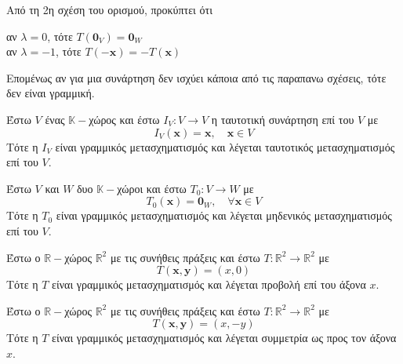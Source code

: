 \begin{rem}
    Από τη 2η σχέση του ορισμού, προκύπτει ότι
      \begin{center}
        αν $ \lambda = 0 $, τότε $ T(\mathbf{0}_{V}) = \mathbf{0}_{W} $ \\
        αν $ \lambda = -1 $, τότε $T(- \mathbf{x}) = - T(\mathbf{x}) $
      \end{center}
      Επομένως αν για μια συνάρτηση δεν ισχύει κάποια από τις παραπανω σχέσεις, τότε 
      δεν είναι γραμμική.
\end{rem}


\begin{example}[Ταυτοτικός]
  Έστω $V$ ένας $ \mathbb{K} - $χώρος και έστω $ I_{V} \colon V \to V $ η ταυτοτική 
  συνάρτηση επί του $V$ με 
  \[
    I_{V}(\mathbf{x}) = \mathbf{x}, \quad \mathbf{x} \in V   
  \]
  Τότε η $I_{V}$ είναι γραμμικός μετασχηματισμός και λέγεται 
  \textcolor{Col1}{ταυτοτικός} μετασχηματισμός επί του $V$. 
\end{example}

\begin{example}[Μηδενικός]
  Έστω $V$ και $W$ δυο $ \mathbb{K}- $χώροι και έστω $ T_{0} \colon V \to W $ με 
  \[
    T_{0}(\mathbf{x}) = \mathbf{0}_{W}, \quad \forall \mathbf{x} \in V
  \]
  Τότε η $T_{0}$ είναι γραμμικός μετασχηματισμός και λέγεται 
  \textcolor{Col1}{μηδενικός} μετασχηματισμός επί του $V$.
\end{example}

\begin{example}
  Έστω ο $ \mathbb{R}- $χώρος $ \mathbb{R}^{2} $ με τις συνήθεις πράξεις και έστω 
  $ T \colon \mathbb{R}^{2} \to \mathbb{R}^{2} $ με 
  \[
    T(\mathbf{x}, \mathbf{y}) = (x, 0) 
  \] 
  Τότε η $T$ είναι γραμμικός μετασχηματισμός και λέγεται \textcolor{Col1}{προβολή} επί 
  του άξονα $x$.
\end{example}

\begin{example}
  Έστω ο $ \mathbb{R}- $χώρος $ \mathbb{R}^{2} $ με τις συνήθεις πράξεις και έστω 
  $ T \colon \mathbb{R}^{2} \to \mathbb{R}^{2} $ με 
  \[
    T(\mathbf{x}, \mathbf{y}) = (x, -y) 
  \] 
  Τότε η $T$ είναι γραμμικός μετασχηματισμός και λέγεται \textcolor{Col1}{συμμετρία} ως 
  προς τον άξονα $x$.
\end{example}

